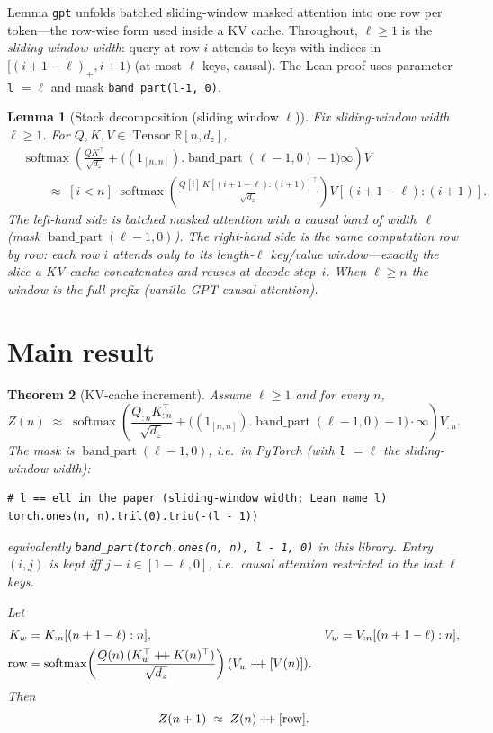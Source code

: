 \documentclass[11pt,a4paper]{article}
\newtheorem{theorem}{Theorem}[section]
\newtheorem{lemma}[theorem]{Lemma}
\newcommand{\Tensor}{\operatorname{Tensor}}
\newcommand{\bandpart}{\operatorname{band\_part}}
\newcommand{\rowop}{\operatorname{row}}
\newcommand{\concat}{\mathbin{+\mkern-4mu+}}
\newcommand{\XEq}{\approx}
\begin{document}
Lemma \texttt{gpt} unfolds batched sliding-window masked attention into one row per token---the row-wise form used inside a KV cache.
Throughout, $\ell\ge 1$ is the \emph{sliding-window width}: query at row $i$ attends to keys with indices in $[(i+1-\ell)_+,i+1)$ (at most $\ell$ keys, causal).
The Lean proof uses parameter \texttt{l} $=\ell$ and mask \texttt{band\_part(l-1, 0)}.

\begin{lemma}[Stack decomposition (sliding window $\ell$)]
\label{lem:gpt}
Fix sliding-window width $\ell\ge 1$.
For $Q,K,V\in\Tensor\mathbb{R}[n,d_z]$,
\begin{align*}
&\operatorname{softmax}\!\left(
\frac{QK^{\top}}{\sqrt{d_z}}
+\bigl((1_{[n,n]}).\bandpart(\ell-1,0)-1\bigr)\infty
\right)V \\
&\qquad\XEq\;
[i<n]\;
\operatorname{softmax}\!\left(\frac{Q[i]\,K[(i+1-\ell):(i+1)]^{\top}}{\sqrt{d_z}}\right)
V[(i+1-\ell):(i+1)].
\end{align*}
The left-hand side is batched masked attention with a causal band of width~$\ell$ (mask $\bandpart(\ell-1,0)$).
The right-hand side is the same computation row by row: each row $i$ attends only to its length-$\ell$ key/value window---exactly the slice a KV cache concatenates and reuses at decode step~$i$.
When $\ell\ge n$ the window is the full prefix (vanilla GPT causal attention).
\end{lemma}

\section{Main result}
\label{sec:main}

\begin{theorem}[KV-cache increment]
\label{thm:kv-cache}
Assume $\ell\ge 1$ and for every $n$,
\begin{equation}
\label{eq:hyp}
Z(n)\;\XEq\;
\operatorname{softmax}\!\left(
\frac{Q_{:n}K_{:n}^{\top}}{\sqrt{d_z}}
+\bigl((1_{[n,n]}).\bandpart(\ell-1,0)-1\bigr)\cdot\infty
\right)
V_{:n}.
\end{equation}
The mask is $\bandpart(\ell-1,0)$, i.e.\ in PyTorch (with \texttt{l} $=\ell$ the sliding-window width):
\begin{verbatim}
# l == ell in the paper (sliding-window width; Lean name l)
torch.ones(n, n).tril(0).triu(-(l - 1))
\end{verbatim}
\noindent
equivalently \texttt{band\_part(torch.ones(n, n), l - 1, 0)} in this library.
Entry $(i,j)$ is kept iff $j-i\in[1-\ell,0]$, i.e.\ causal attention restricted to the last $\ell$ keys.

Let
\begin{align*}
K_w&=K_{:n}[(n+1-\ell):n],&
V_w&=V_{:n}[(n+1-\ell):n],\\
\rowop&=
\operatorname{softmax}\!\left(\frac{Q(n)\,(K_w^{\top}\concat K(n)^{\top})}{\sqrt{d_z}}\right)
(V_w\concat[V(n)]).
\end{align*}
Then
\begin{equation}
\label{eq:conc}
Z(n+1)\;\XEq\; Z(n)\concat[\rowop].
\end{equation}
\end{theorem}
\end{document}
